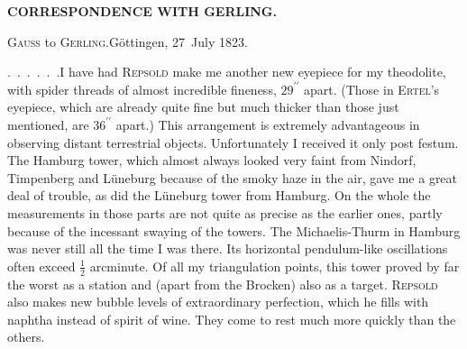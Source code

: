 \par\clearpage
\noindent{}\hfill{\small\textbf{CORRESPONDENCE WITH GERLING.}}\hfill\null\par\medskip
\begin{center}
\textsc{Gauss} to \textsc{Gerling}.\quad Göttingen, 27~July 1823.
\end{center}

\par\noindent\hspace*{\parindent}\mbox{.\ .\ .\ .\ .\ .}\quad I have had \textsc{Repsold} make me another new eyepiece for my theodolite, with spider threads of almost incredible fineness, \(29^{\prime\prime}\) apart.
(Those in \textsc{Ertel}'s eyepiece, which are already quite fine but much thicker than those just mentioned, are \(36^{\prime\prime}\) apart.)
This arrangement is extremely advantageous in observing distant  terrestrial objects. Unfortunately I received it only post festum.
The Hamburg tower, which almost always looked very faint from Nindorf, Timpenberg and Lüneburg because of the smoky haze in the air, gave me a great deal of trouble, as did the Lüneburg tower from Hamburg. On the whole the measurements in those parts are not quite as precise as the earlier ones, partly because of the incessant swaying of the towers.
The Michaelis-Thurm in Hamburg was never still all the time I was there. Its horizontal pendulum-like oscillations often exceed \(\frac{1}{2}\) arcminute.
Of all my triangulation points, this tower proved by far the worst as a station and (apart from the Brocken) also as a target.
\textsc{Repsold} also makes new bubble levels of extraordinary perfection, which he fills with naphtha instead of spirit of wine.
They come to rest much more quickly than the others.

